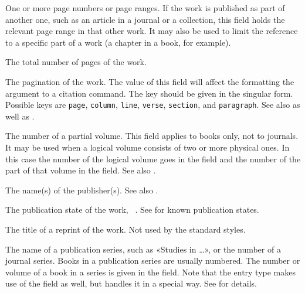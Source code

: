 \documentclass{ltxdockit}[2011/03/25]
\begin{document}
\begin{fieldlist}

One or more page numbers or page ranges. If the work is published as part of another one, such as an article in a journal or a collection, this field holds the relevant page range in that other work. It may also be used to limit the reference to a specific part of a work (a chapter in a book, for example).


The total number of pages of the work.


The pagination of the work. The value of this field will affect the formatting the  argument to a citation command. The key should be given in the singular form. Possible keys are \texttt{page}, \texttt{column}, \texttt{line}, \texttt{verse}, \texttt{section}, and \texttt{paragraph}. See also  as well as .


The number of a partial volume. This field applies to books only, not to journals. It may be used when a logical volume consists of two or more physical ones. In this case the number of the logical volume goes in the  field and the number of the part of that volume in the  field. See also .


The name(s) of the publisher(s). See also .


The publication state of the work, \eg\ <in press>. See  for known publication states.


The title of a reprint of the work. Not used by the standard styles.


The name of a publication series, such as «Studies in \dots», or the number of a journal series. Books in a publication series are usually numbered. The number or volume of a book in a series is given in the  field. Note that the  entry type makes use of the  field as well, but handles it in a special way. See  for details.



\end{fieldlist}
\end{document}
